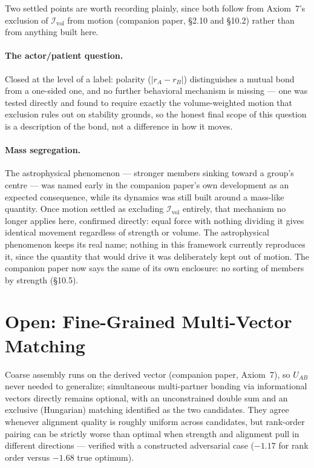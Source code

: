 \documentclass[12pt, a4paper]{article}
\begin{document}
Two settled points are worth recording plainly, since both follow
from Axiom~7's exclusion of $\mathcal{I}_{\mathrm{vol}}$ from motion (companion paper, \S2.10 and \S10.2) rather than from anything built
here.

\paragraph{The actor/patient question.} Closed at the level of a
label: polarity ($\lvert r_A-r_B\rvert$) distinguishes a mutual bond
from a one-sided one, and no further behavioral mechanism is
missing --- one was tested directly and found to require exactly
the volume-weighted motion that exclusion rules out on stability
grounds, so the honest final scope of this question is a
description of the bond, not a difference in how it moves.

\paragraph{Mass segregation.} The astrophysical phenomenon ---
stronger members sinking toward a group's centre --- was named
early in the companion paper's own development as an expected
consequence, while its dynamics was still built around a mass-like
quantity. Once motion settled as excluding $\mathcal{I}_{\mathrm{vol}}$
entirely, that mechanism no longer applies here, confirmed directly:
equal force with nothing dividing it gives identical movement
regardless of strength or volume. The astrophysical phenomenon keeps
its real name; nothing in this framework currently reproduces it,
since the quantity that would drive it was deliberately kept out of motion. The companion paper
now says the same of its own enclosure: no sorting of members by strength (\S10.5).

\section{Open: Fine-Grained Multi-Vector Matching}
\label{sec:open_matching}

Coarse assembly runs on the derived vector (companion paper,
Axiom~7), so $U_{AB}$ never needed to generalize; simultaneous
multi-partner bonding via informational vectors directly remains
optional, with an unconstrained double sum and an exclusive
(Hungarian) matching identified as the two candidates. They agree
whenever alignment quality is roughly uniform across candidates, but
rank-order pairing can be strictly worse than optimal when strength
and alignment pull in different directions --- verified with a
constructed adversarial case ($-1.17$ for rank order versus $-1.68$
true optimum).
\end{document}
